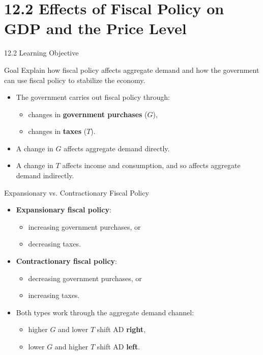 \documentclass[aspectratio=169]{beamer}
\begin{document}
\section{12.2 Effects of Fiscal Policy on GDP and the Price Level}

\begin{frame}{12.2 Learning Objective}
\transfade
\begin{block}{Goal}
Explain how fiscal policy affects aggregate demand and how the government can use fiscal policy to stabilize the economy.
\end{block}
\begin{itemize}
  \item The government carries out fiscal policy through:
  \begin{itemize}
    \item changes in \textbf{government purchases} (\(G\)),
    \item changes in \textbf{taxes} (\(T\)).
  \end{itemize}
  \item A change in \(G\) affects aggregate demand \alert{directly}.
  \item A change in \(T\) affects income and consumption, and so affects aggregate demand \alert{indirectly}.
\end{itemize}
\end{frame}

\begin{frame}{Expansionary vs. Contractionary Fiscal Policy}
\transfade
\begin{itemize}
  \item \textbf{Expansionary fiscal policy}:
  \begin{itemize}
    \item increasing government purchases, or
    \item decreasing taxes.
  \end{itemize}
  \item \textbf{Contractionary fiscal policy}:
  \begin{itemize}
    \item decreasing government purchases, or
    \item increasing taxes.
  \end{itemize}
  \item Both types work through the aggregate demand channel:
  \begin{itemize}
    \item higher \(G\) and lower \(T\) shift AD \textbf{right},
    \item lower \(G\) and higher \(T\) shift AD \textbf{left}.
  \end{itemize}
\end{itemize}
\end{frame}
\end{document}
